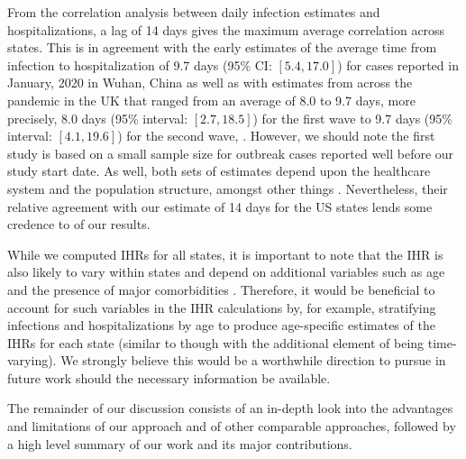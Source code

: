 \documentclass{article}
\begin{document}
From the correlation analysis between daily infection estimates and
hospitalizations, a lag of 14 days gives the maximum average correlation 
across states. This is in agreement with the early estimates of the average time from
infection to hospitalization of 9.7 days (95\% CI: $[5.4, 17.0]$) for
cases reported in January, 2020 in Wuhan, China as well as with estimates from
across the pandemic in the UK that ranged from an average of 8.0 to 9.7
days, more precisely, 8.0 days (95\% interval: $[2.7, 18.5]$) for the first
wave to 9.7 days (95\% interval: $[4.1, 19.6]$) for the second wave,
\citep{ward2021understanding}. However, we should note the first study is based
on a small sample size for outbreak cases reported well before our study start
date. As well, both sets of estimates depend upon the healthcare system and the
population structure, amongst other things \citep{ward2021understanding}.
Nevertheless, their relative agreement with our estimate of 14 days for the US
states lends some credence to of our results. 

While we computed IHRs for all states, it is important to note that the IHR is
 also likely to vary within states and depend on additional variables such as
 age and the presence of major comorbidities \citep{russell2023comorbidities}.
 Therefore, it would be beneficial to account for such variables in the IHR
 calculations by, for example, stratifying infections and hospitalizations by
 age to produce age-specific estimates of the IHRs for each state (similar to
 \citealp{fox2023disproportionate} though with the additional element of being
 time-varying). We strongly believe this would be a worthwhile direction to
 pursue in future work should the necessary information be available. 

The remainder of our discussion consists of an in-depth look into the advantages and
limitations of our approach and of other comparable approaches, followed by a
high level summary of our work and its major contributions. 
\end{document}
